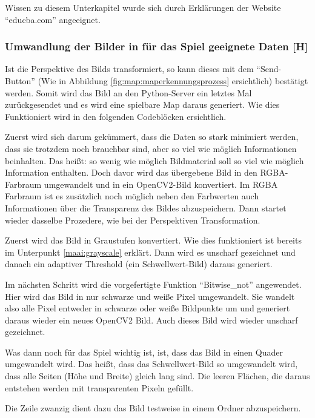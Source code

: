 Wissen zu diesem Unterkapitel wurde sich durch Erklärungen der Website ``educba.com'' angeeignet. \cite{educba}

\subsubsection{Umwandlung der Bilder in für das Spiel geeignete Daten [H]}\label{maai:udbifdsbd:head}
Ist die Perspektive des Bilds transformiert, so kann dieses mit dem ``Send-Button'' (Wie in Abbildung \ref{fig:map:maperkennungsprozess} ersichtlich) bestätigt werden.
Somit wird das Bild an den Python-Server ein letztes Mal zurückgesendet und es wird eine spielbare Map daraus generiert.
Wie dies Funktioniert wird in den folgenden Codeblöcken ersichtlich.

Zuerst wird sich darum gekümmert, dass die Daten so stark minimiert werden, dass sie trotzdem noch brauchbar sind, aber so viel wie möglich Informationen beinhalten. Das heißt: so wenig wie möglich Bildmaterial soll so viel wie möglich Information enthalten. Doch davor wird das übergebene Bild in den RGBA-Farbraum umgewandelt und in ein OpenCV2-Bild konvertiert. Im RGBA Farbraum ist es zusätzlich noch möglich neben den Farbwerten auch Informationen über die Transparenz des Bildes abzuspeichern. Dann startet wieder dasselbe Prozedere, wie bei der Perspektiven Transformation.

Zuerst wird das Bild in Graustufen konvertiert. Wie dies funktioniert ist bereits im Unterpunkt \ref{maai:grayscale} erklärt. Dann wird es unscharf gezeichnet und danach ein adaptiver Threshold (ein Schwellwert-Bild) daraus generiert.

Im nächsten Schritt wird die vorgefertigte Funktion ``Bitwise\_not'' angewendet. Hier wird das Bild in nur schwarze und weiße Pixel umgewandelt. Sie wandelt also alle Pixel entweder in schwarze oder weiße Bildpunkte um und generiert daraus wieder ein neues OpenCV2 Bild. Auch dieses Bild wird wieder unscharf gezeichnet.

Was dann noch für das Spiel wichtig ist, ist, dass das Bild in einen Quader umgewandelt wird. Das heißt, dass das Schwellwert-Bild so umgewandelt wird, dass alle Seiten (Höhe und Breite) gleich lang sind. Die leeren Flächen, die daraus entstehen werden mit transparenten Pixeln gefüllt.

Die Zeile zwanzig dient dazu das Bild testweise in einem Ordner abzuspeichern.

